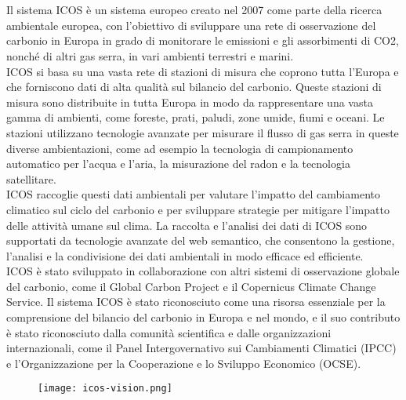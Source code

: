 \chapter{\introductionname}
\label{chap:introduction}

Il sistema ICOS è un sistema europeo creato nel 2007 come parte della ricerca 
ambientale europea, con l'obiettivo di sviluppare una rete di osservazione del carbonio in Europa
in grado di monitorare le emissioni e gli assorbimenti di CO2, nonché di altri gas serra,
in vari ambienti terrestri e marini.\\

ICOS si basa su una vasta rete di stazioni di misura che coprono tutta l'Europa e che forniscono 
dati di alta qualità sul bilancio del carbonio. Queste stazioni di misura sono distribuite in 
tutta Europa in modo da rappresentare una vasta gamma di ambienti, come foreste, prati, paludi,
zone umide, fiumi e oceani. Le stazioni utilizzano tecnologie avanzate per misurare il flusso
di gas serra in queste diverse ambientazioni, come ad esempio la tecnologia di campionamento 
automatico per l'acqua e l'aria, la misurazione del radon e la tecnologia satellitare.\\

ICOS raccoglie questi dati ambientali per valutare l'impatto del cambiamento climatico
sul ciclo del carbonio e per sviluppare strategie per mitigare l'impatto delle attività
umane sul clima. La raccolta e l'analisi dei dati di ICOS sono supportati da tecnologie 
avanzate del web semantico, che consentono la gestione, l'analisi e la condivisione dei dati 
ambientali in modo efficace ed efficiente.\\

ICOS è stato sviluppato in collaborazione con altri sistemi di osservazione globale del carbonio,
come il Global Carbon Project e il Copernicus Climate Change Service.
Il sistema ICOS è stato riconosciuto come una risorsa essenziale per la comprensione
del bilancio del carbonio in Europa e nel mondo, e il suo contributo è stato riconosciuto
dalla comunità scientifica e dalle organizzazioni internazionali, come il Panel Intergovernativo
sui Cambiamenti Climatici (IPCC) e l'Organizzazione per la Cooperazione e lo Sviluppo Economico (OCSE).\\

\begin{figure}[h]
    \texttt{[image: icos-vision.png]}
\end{figure}